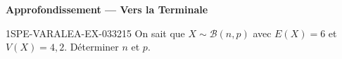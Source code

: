 \begin{center}\textbf{Approfondissement — Vers la Terminale}\end{center}
\begin{exercice}{1SPE-VARALEA-EX-033}{2}{15}
On sait que $X \sim \mathcal{B}(n, p)$ avec $E(X) = 6$ et $V(X) = 4{,}2$. Déterminer $n$ et $p$.
\end{exercice}
